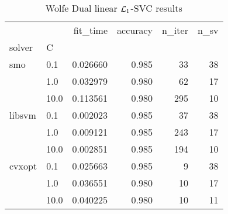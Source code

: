 \begin{table}[H]
\centering
\caption{Wolfe Dual linear $\protect \mathcal{L}_1$-SVC results}
\label{linear_dual_l1_svc_cv_results}
\begin{tabular}{llrrrr}
\toprule
       &      &  fit\_time &  accuracy &  n\_iter &  n\_sv \\
solver & C &           &           &         &       \\
\midrule
smo & 0.1  &  0.026660 &     0.985 &      33 &    38 \\
       & 1.0  &  0.032979 &     0.980 &      62 &    17 \\
       & 10.0 &  0.113561 &     0.980 &     295 &    10 \\
libsvm & 0.1  &  0.002023 &     0.985 &      37 &    38 \\
       & 1.0  &  0.009121 &     0.985 &     243 &    17 \\
       & 10.0 &  0.002851 &     0.985 &     194 &    10 \\
cvxopt & 0.1  &  0.025663 &     0.985 &       9 &    38 \\
       & 1.0  &  0.036551 &     0.980 &      10 &    17 \\
       & 10.0 &  0.040225 &     0.980 &      10 &    11 \\
\bottomrule
\end{tabular}
\end{table}
